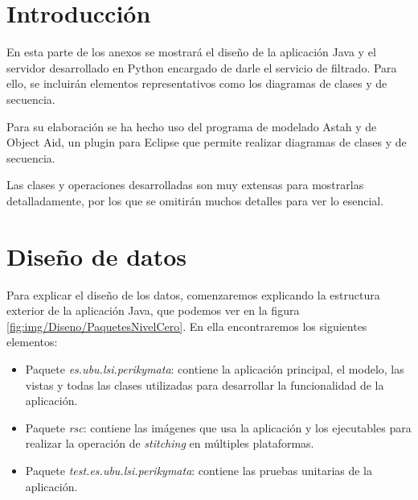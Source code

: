 
\section{Introducción}
En esta parte de los anexos se mostrará el diseño de la aplicación Java y el servidor desarrollado en Python encargado de darle el servicio de filtrado. Para ello, se incluirán elementos representativos como los diagramas de clases y de secuencia.

Para su elaboración se ha hecho uso del programa de modelado Astah y de Object Aid, un plugin para Eclipse que permite realizar diagramas de clases y de secuencia.

Las clases y operaciones desarrolladas son muy extensas para mostrarlas detalladamente, por los que se omitirán muchos detalles para ver lo esencial.

\section{Diseño de datos}
 
Para explicar el diseño de los datos, comenzaremos explicando la estructura exterior de la aplicación Java, que podemos ver en la figura \ref{fig:img/Diseno/PaquetesNivelCero}. En ella encontraremos los siguientes elementos:
\begin{itemize}
    \item Paquete \textit{es.ubu.lsi.perikymata}: contiene la aplicación principal, el modelo, las vistas y todas las clases utilizadas para desarrollar la funcionalidad de la aplicación.
    \item Paquete \textit{rsc}: contiene las imágenes que usa la aplicación y los ejecutables para realizar la operación de \textit{stitching} en múltiples plataformas.
    \item Paquete \textit{test.es.ubu.lsi.perikymata}: contiene las pruebas unitarias de la aplicación.
\end{itemize}


